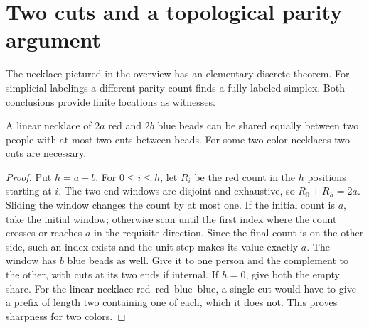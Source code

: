 \section{Two cuts and a topological parity argument}
\label{sec:topo}
The necklace pictured in the overview has an elementary discrete theorem. For simplicial labelings a different parity count finds a fully labeled simplex. Both conclusions provide finite locations as witnesses.

\begin{theorem}\label{result71}
A linear necklace of $2a$ red and $2b$ blue beads can be shared equally between two people with at most two cuts between beads. For some two-color necklaces two cuts are necessary.
\end{theorem}
\begin{proof}
Put $h=a+b$. For $0\le i\le h$, let $R_i$ be the red count in the $h$ positions starting at $i$. The two end windows are disjoint and exhaustive, so $R_0+R_h=2a$. Sliding the window changes the count by at most one. If the initial count is $a$, take the initial window; otherwise scan until the first index where the count crosses or reaches $a$ in the requisite direction. Since the final count is on the other side, such an index exists and the unit step makes its value exactly $a$. The window has $b$ blue beads as well. Give it to one person and the complement to the other, with cuts at its two ends if internal. If $h=0$, give both the empty share. For the linear necklace red--red--blue--blue, a single cut would have to give a prefix of length two containing one of each, which it does not. This proves sharpness for two colors.
\end{proof}

